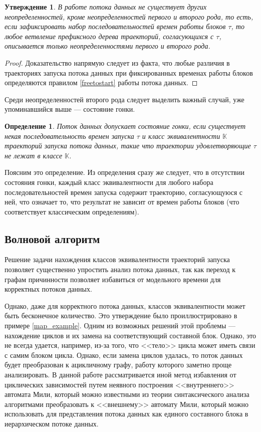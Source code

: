 \documentclass[10pt,a4paper]{article}
\newtheorem{defen}{Определение}
\newtheorem{theorem}{Утверждение}
\begin{document}
  \begin{theorem}
    \label{indeterminacy_theorem}
    В работе потока данных не существует других неопределенностей, кроме неопределенностей первого и второго рода, то есть,
    если зафиксировать набор последовательностей времен работы блоков $\tau$, то любое ветвление префиксного дерева траекторий, согласующихся с $\tau$,
    описывается только неопределенностями первого и второго рода.
  \end{theorem}
  \begin{proof}
    Доказательство напрямую следует из факта, что любые различия в траекториях запуска потока данных при фиксированных временах работы блоков определяются
    правилом \eqref{freetostart} работы потока данных.
  \end{proof}
  
  Среди неопределенностей второго рода следует выделить важный случай, уже упоминавшийся выше --- состояние гонки.
  
  \begin{defen}
    Поток данных допускает состояние гонки, если существует некая последовательность времен запуска $\tau$ и класс эквивалентности $\mathbb{K}$
    траекторий запуска потока данных, такие что траектории удовлетворяющие $\tau$ не лежат в классе $\mathbb{K}$.
  \end{defen}
  
  Поясним это определение. Из определения сразу же следует, что в отсутствии состояния гонки, каждый класс эквивалентности для любого набора последовательностей
  времен запуска содержит траекторию, согласующуюся с ней, что означает то,
  что результат не зависит от времен работы блоков (что соответствует классическим определениям).
  
\subsection{Волновой алгоритм}  
  Решение задачи нахождения классов эквивалентности траекторий запуска позволяет существенно упростить анализ потока данных, так как
  переход к графам причинности позволяет избавиться от модельного времени для корректных потоков данных.
  
  Однако, даже для корректного потока данных, классов эквивалентности может быть бесконечное количество. Это утверждение было проиллюстрировано в примере \ref{map_example}.
  Одним из возможных решений этой проблемы --- нахождение циклов и их замена на соответствующий составной блок. Однако, это не всегда удается, например,
  из-за того, что <<тело>> цикла может иметь связи с самим блоком цикла. Однако, если замена циклов удалась, то поток данных будет преобразован к ацикличному графу,
  работу которого заметно проще анализировать. В данной работе рассматривается иной метод избавления от циклических зависимостей путем неявного построения
  <<внутреннего>> автомата Мили, который можно известными из теории синтаксического анализа алгоритмами преобразовать к <<внешнему>> автомату Мили, который
  можно использовать для представления потока данных как единого составного блока в иерархическом потоке данных.
\end{document}
